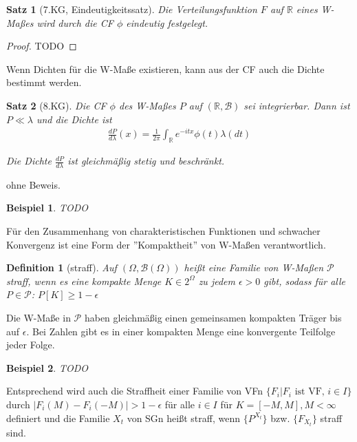 \documentclass[]{article}
\newtheorem{theorem}{Satz}
\newtheorem{definition}{Definition}
\newtheorem*{example}{Beispiel}
\begin{document}
\begin{theorem}[7.KG, Eindeutigkeitssatz]
	Die Verteilungsfunktion $F$ auf $\mathbb{R}$ eines W-Maßes wird durch die CF $\phi$ eindeutig festgelegt.
\end{theorem}

\begin{proof}
	TODO
\end{proof}

Wenn Dichten für die W-Maße existieren, kann aus der CF auch die Dichte bestimmt werden.

\begin{theorem}[8.KG]
	Die CF $\phi$ des W-Maßes $P$ auf $(\mathbb{R}, \mathcal{B})$ sei integrierbar. Dann ist $P\ll\lambda$ und die Dichte ist
	\begin{align*}
		\frac{dP}{d\lambda}(x) = \frac{1}{2\pi} \int_{\mathbb{R}} e^{-itx} \phi(t) \lambda(dt)
	\end{align*}

	Die Dichte $\frac{dP}{d\lambda}$ ist gleichmäßig stetig und beschränkt.
\end{theorem}

ohne Beweis.

\begin{example}
	TODO
\end{example}

Für den Zusammenhang von charakteristischen Funktionen und schwacher Konvergenz ist eine Form der ''Kompaktheit'' von W-Maßen verantwortlich.

\begin{definition}[straff]
	Auf $(\Omega, \mathcal{B}(\Omega))$ heißt eine Familie von W-Maßen $\mathcal{P}$ straff, wenn es eine kompakte Menge $K \in 2^\Omega$ zu jedem $\epsilon > 0$ gibt, sodass für alle $P\in \mathcal{P}$: $P[K]\geq 1-\epsilon$
\end{definition}

Die W-Maße in $\mathcal{P}$ haben gleichmäßig einen gemeinsamen kompakten Träger bis auf $\epsilon$. Bei Zahlen gibt es in einer kompakten Menge eine konvergente Teilfolge jeder Folge.

\begin{example}
	TODO
\end{example}

Entsprechend wird auch die Straffheit einer Familie von VFn $\{F_i | F_i \text{ ist VF, } i\in I\}$ durch $|F_i(M)-F_i(-M)| > 1-\epsilon$ für alle $i\in I$ für $K=[-M, M], M < \infty$ definiert und die Familie ${X_t}$ von SGn heißt straff, wenn $\{P^{X_t}\}$ bzw. $\{F_{X_t}\}$ straff sind.
\end{document}
